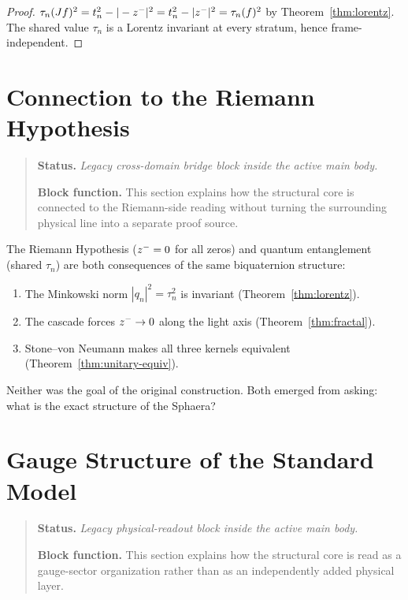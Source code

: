 \begin{proof}
$\tau_n(Jf)^2 = t_n^2 - |-z^-|^2 = t_n^2 - |z^-|^2 = \tau_n(f)^2$
by Theorem~\ref{thm:lorentz}.
The shared value $\tau_n$ is a Lorentz invariant at every stratum,
hence frame-independent.
\end{proof}


\section{Connection to the Riemann Hypothesis}
\begin{quote}\small
\noindent\textbf{Status.} \emph{Legacy cross-domain bridge block inside the active main body.}\par
\noindent\textbf{Block function.} This section explains how the structural core is connected to the Riemann-side reading without turning the surrounding physical line into a separate proof source.
\end{quote}
\label{sec:rh}

\begin{remark}
The Riemann Hypothesis ($z^-=0$ for all zeros) and quantum
entanglement (shared $\tau_n$) are both consequences of the same
biquaternion structure:
\begin{enumerate}
  \item The Minkowski norm $|q_n|^2=\tau_n^2$ is invariant
        (Theorem~\ref{thm:lorentz}).
  \item The cascade forces $z^-\to 0$ along the light axis
        (Theorem~\ref{thm:fractal}).
  \item Stone--von Neumann makes all three kernels equivalent
        (Theorem~\ref{thm:unitary-equiv}).
\end{enumerate}
Neither was the goal of the original construction.
Both emerged from asking: what is the exact structure of the Sphaera?
\end{remark}


\section{Gauge Structure of the Standard Model}
\begin{quote}\small
\noindent\textbf{Status.} \emph{Legacy physical-readout block inside the active main body.}\par
\noindent\textbf{Block function.} This section explains how the structural core is read as a gauge-sector organization rather than as an independently added physical layer.
\end{quote}
\label{sec:gauge}

